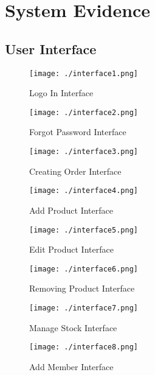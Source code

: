 	
	
	


\section{System Evidence}

\subsection{User Interface}

\begin{figure}[H]
    \texttt{[image: ./interface1.png]}
    \caption{Logo In Interface} \label{fig:log-in-interface}
\end{figure}

\begin{figure}[H]
    \texttt{[image: ./interface2.png]}
    \caption{Forgot Password Interface} \label{fig:forgot-password-interface}
\end{figure}

\begin{figure}[H]
    \texttt{[image: ./interface3.png]}
    \caption{Creating Order Interface} \label{fig:creating-order-interface}
\end{figure}

\begin{figure}[H]
    \texttt{[image: ./interface4.png]}
    \caption{Add Product Interface} \label{fig:add-product-interface}
\end{figure}

\begin{figure}[H]
    \texttt{[image: ./interface5.png]}
    \caption{Edit Product Interface} \label{fig:edit-product-interface}
\end{figure}

\begin{figure}[H]
    \texttt{[image: ./interface6.png]}
    \caption{Removing Product Interface} \label{fig:removing-product-interface}
\end{figure}

\begin{figure}[H]
    \texttt{[image: ./interface7.png]}
    \caption{Manage Stock Interface} \label{fig:stock-interface}
\end{figure}

\begin{figure}[H]
    \texttt{[image: ./interface8.png]}
    \caption{Add Member Interface} \label{fig:add-member-instance}
\end{figure}


